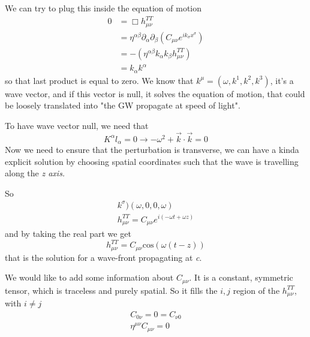 We can try to plug this inside the equation of motion
\begin{align*}
	0 &= \Box h^{TT}_{\mu \nu }\\
	  &= \eta ^{\alpha \beta }\partial_{\alpha }\partial_{\beta }\left( C_{\mu \nu }e^{ik_{\sigma }x^{\sigma }} \right) \\
	  &= - \left( \eta ^{\alpha \beta }k_{\alpha }k_{\beta }h^{TT}_{\mu \nu } \right)\\
	  &= k_{\alpha }k^{\alpha }
\end{align*}
so that last product is equal to zero. We know that $k^{\mu } =\left( \omega , k^{1},k^{2},k^{3} \right)$, it's a wave vector, and if this vector is null, it solves the equation of motion, that could be loosely translated into "the GW propagate at speed of light".\par
To have wave vector null, we need that
\[
K^{\alpha }l_{\alpha } = 0 \to - \omega ^{2} + \vec{k}\cdot \vec{k}=0
\]
Now we need to ensure that the perturbation is transverse, we can have a kinda explicit solution by choosing spatial coordinates such that the wave is travelling along the \emph{z axis.}\par
So
\begin{align*}
k^{\sigma } ) \left( \omega , 0,0, \omega  \right)\\
h^{TT}_{\mu \nu } = C_{\mu \nu }e^{i\left( -\omega t +\omega z \right)} 
\end{align*}
and by taking the real part we get
\[
h^{TT}_{\mu \nu } = C_{\mu \nu } \text{cos}\left( \omega \left( t-z \right) \right)
\]
that is the solution for a wave-front propagating at \emph{c}.\par
We would like to add some information about $C_{\mu \nu }$. It is a constant, symmetric tensor, which is traceless and purely spatial. So it fills the $i,j$ region of the $h_{\mu \nu }^{TT}$, with $i\neq j$
\begin{gather*}
C_{0\nu } = 0 = C_{\nu 0} \\
\eta ^{\mu \nu }C_{\mu \nu } = 0
\end{gather*}

